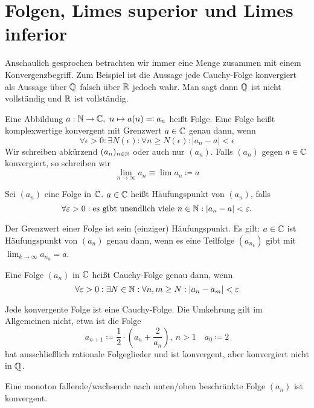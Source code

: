 \section*{Folgen, Limes superior und Limes inferior}
Anschaulich gesprochen betrachten wir immer eine Menge zusammen mit einem Konvergenzbegriff. Zum Beispiel ist 
die Aussage jede Cauchy-Folge konvergiert als Aussage über $\mathbb{Q}$ falsch über $\mathbb{R}$ jedoch wahr. Man sagt dann $\mathbb{Q}$ ist nicht vollständig und 
$\mathbb{R}$ ist vollständig. 
\begin{defn}
    Eine Abbildung $a:\mathbb{N}\to \mathbb{C}, \ n\mapsto a(n) \eqqcolon a_n$ heißt Folge. Eine Folge heißt komplexwertige
    konvergent mit Grenzwert $a\in \mathbb{C}$ genau dann, wenn 
    \[
    \forall \epsilon >0 : \exists N(\epsilon) : \forall n\ge N(\epsilon) : \vert a_n -a \vert < \epsilon    
    \] 
    Wir schreiben abkürzend $(a_n)_{n\in \mathbb{N}}$ oder auch nur $(a_n)$. Falls $(a_n)$ gegen $a\in \mathbb{C}$ konvergiert, so schreiben wir 
    \[
        \lim_{n\to \infty} a_n \equiv \lim a_n \coloneqq a
    \]
\end{defn}
\begin{defn}
    Sei $(a_n)$ eine Folge in $\mathbb{C}$. $a\in \mathbb{C}$ heißt Häufungspunkt von $(a_n)$, falls 
    \[
    \forall \varepsilon>0 : \textrm{es gibt unendlich viele } n\in \mathbb{N} : \vert a_n - a \vert < \varepsilon.    
    \] 
\end{defn}
\begin{bem}
    Der Grenzwert einer Folge ist sein (einziger) Häufungspunkt. Es gilt: $a\in \mathbb{C}$ ist Häufungspunkt von $(a_n)$ genau dann, wenn es eine Teilfolge $(a_{n_k})$ gibt mit $\lim_{k\to\infty} a_{n_k} = a$. 
\end{bem}
\begin{defn}
    Eine Folge $(a_n)$ in $\mathbb{C}$ heißt Cauchy-Folge genau dann, wenn 
    \[
    \forall \varepsilon > 0: \exists N\in \mathbb{N}:\forall n,m \ge N: \vert a_n -a_m \vert <\varepsilon    
    \]
\end{defn}
\begin{bem} Jede konvergente Folge ist eine Cauchy-Folge. Die Umkehrung gilt im Allgemeinen nicht, etwa ist die Folge 
    \[
    a_{n+1} \coloneqq \frac{1}{2}\cdot \left( a_n + \frac{2}{a_n}\right), \ n>1 \quad a_0 \coloneqq 2     
    \]
    hat ausschließlich rationale Folgeglieder und ist konvergent, aber konvergiert nicht in $\mathbb{Q}$.
\end{bem}
\begin{lemma}
    Eine monoton fallende/wachsende nach unten/oben beschränkte Folge $(a_n)$ ist konvergent. 
\end{lemma}

